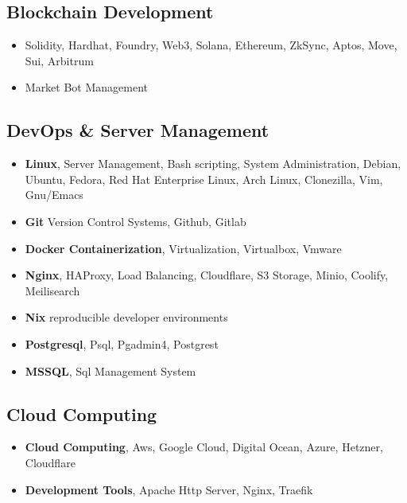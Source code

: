 \documentclass[line,margin]{res}
\begin{document}
\begin{resume}
                 \subsection{Blockchain Development}
                 \begin{itemize}  \itemsep -2pt %
                        \item Solidity, Hardhat, Foundry, Web3, Solana, Ethereum, ZkSync, Aptos, Move, Sui, Arbitrum
                        \item Market Bot Management 
                 \end{itemize}
                 \subsection{DevOps \& Server Management}
                 \begin{itemize}  \itemsep -2pt %
                   \item \textbf{Linux}, Server Management, Bash scripting, System Administration, Debian, Ubuntu, Fedora, Red Hat Enterprise Linux, Arch Linux, Clonezilla, Vim, Gnu/Emacs
                   \item \textbf{Git} Version Control Systems, Github, Gitlab
                   \item \textbf{Docker Containerization}, Virtualization, Virtualbox, Vmware
                   \item \textbf{Nginx}, HAProxy, Load Balancing, Cloudflare, S3 Storage, Minio, Coolify, Meilisearch
                   \item \textbf{Nix} reproducible developer environments
                   \item \textbf{Postgresql}, Psql, Pgadmin4, Postgrest 
                   \item \textbf{MSSQL}, Sql Management System 
                 \end{itemize}
                 \subsection{Cloud Computing}
                 \begin{itemize}  \itemsep -2pt %
                   \item \textbf{Cloud Computing}, Aws, Google Cloud, Digital Ocean, Azure, Hetzner, Cloudflare
                   \item \textbf{Development Tools}, Apache Http Server, Nginx, Traefik 
                 \end{itemize}

\end{resume}
\end{document}
